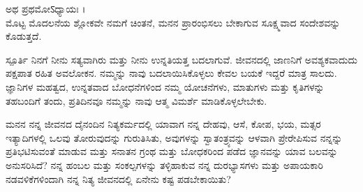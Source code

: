 ಅಥ ಪ್ರಥಮೋऽಧ್ಯಾಯಃ ।\\
ಮೊಟ್ಟ ಮೊದಲನೆಯ ಶ್ಲೋಕವೇ ನಮಗೆ ಚಿಂತನೆ, ಮನನ ಪ್ರಾರಂಭಿಸಲು ಬೇಕಾಗುವ ಸೂಕ್ಷ್ಮವಾದ ಸಂದೇಶವನ್ನು ಕೊಡುತ್ತದೆ.\\
\begin{inspiration}{\kanfont ಸ್ಪೂರ್ತಿ}
ನಿನಗೆ ನೀನು ಸತ್ಯವಾಗಿರು ಮತ್ತು ನೀನು ಉನ್ನತಿಯತ್ತ ಬದಲಾಗುವೆ. ಜೀವನದಲ್ಲಿ ಜಾಣನಿಗೆ ಅವಶ್ಯಕವಾದುದು ಪಕ್ಷಪಾತ ರಹಿತ ಅವಲೋಕನ. ನಮ್ಮನ್ನು ನಾವು ಬದಲಾಯಿಸಿಕೊಳ್ಳಲು ಕೇವಲ ಬಯಕೆ ಇದ್ದರೆ ಮಾತ್ರ ಸಾಲದು. ಜ್ಞಾನಿಗಳ ಮಹತ್ವದ, ಉನ್ನತವಾದ ಬೋಧನೆಗಳಿಂದ ನಮ್ಮ ಯೋಚನೆಗಳು, ಮಾತುಗಳು ಮತ್ತು ಕೃತಿಗಳನ್ನು ತಹಬಂದಿಗೆ ತಂದು, ಪ್ರತಿದಿನವೂ ನಮ್ಮನ್ನು ನಾವು ಆತ್ಮ ವಿಮರ್ಶೆ ಮಾಡಿಕೊಳ್ಳಲೇಬೇಕು.
\end{inspiration}
\newpage
\begin{mananam}{\kanfont ಮನನ}
ನನ್ನ ಜೀವನದ ದೈನಂದಿನ ನಿತ್ಯಕರ್ಮದಲ್ಲಿ ಯಾವಾಗ ನನ್ನ ದೇಹವು, ಆಸೆ, ಕೋಪ, ಭಯ, ಮತ್ಸರ ಇತ್ಯಾದಿಗಳಲ್ಲಿ ಒಲವು ತೋರುವುದನ್ನು ಗುರುತಿಸಿತು, ಅವುಗಳನ್ನು ಸ್ವಾತಂತ್ರ್ಯವನ್ನು ಆಳವಾಗಿ ಪ್ರೇರೇಪಿಸುವ ನನ್ನನ್ನು ಪ್ರತಿಭಟಿಸುವಂತೆ ಮಾಡುವ ಮತ್ತು ಸನಾತನ ಗ್ರಂಥ ಮತ್ತು ಬೋಧಕರಿಂದ ಪಡೆದ ಜ್ಞಾನವನ್ನು ಯಾವ ಬಲವನ್ನು ಅನುಸರಿಸಿದೆ? ನನ್ನ ಹಂಬಲ ಮತ್ತು ಸಂಕಲ್ಪಗಳನ್ನು ತಳ್ಳಿಹಾಕುವ ನನ್ನ ದುರಭ್ಯಾಸಗಳು ಮತ್ತು ಅಪಾಯಕಾರಿ ನಡವಳಿಕೆಗಳಿಂದಾಗಿ ನನ್ನ ನಿತ್ಯ ಜೀವನದಲ್ಲಿ ಏನೇನು ಕಷ್ಟ ಪಡಬೇಕಾಯಿತು?
\end{mananam}
\Linepage
\newpage

